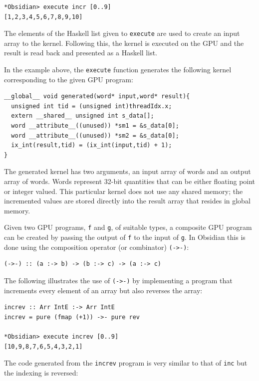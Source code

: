 \begin{small}
\begin{verbatim}
*Obsidian> execute incr [0..9]
[1,2,3,4,5,6,7,8,9,10]
\end{verbatim}
\end{small}
\noindent
The elements of the Haskell list given to {\tt execute} are used to create 
an input array to the kernel. Following this, the kernel is executed on the
GPU and the result is read back and presented as a Haskell list. 

In the example above, the {\tt execute} function generates the following kernel 
corresponding to the given GPU program:
\begin{small}
\begin{verbatim}
__global__ void generated(word* input,word* result){
  unsigned int tid = (unsigned int)threadIdx.x;
  extern __shared__ unsigned int s_data[];
  word __attribute__((unused)) *sm1 = &s_data[0];
  word __attribute__((unused)) *sm2 = &s_data[0];
  ix_int(result,tid) = (ix_int(input,tid) + 1);
}
\end{verbatim}
\end{small}
\noindent
The generated kernel has two arguments, an input array of words and an 
output array of words. Words represent 32-bit quantities that can be either
floating point or integer valued. This particular kernel does not use 
any shared memory; the incremented values are stored directly into the 
result array that resides in global memory.  

\pagebreak 

Given two GPU programs, {\tt f} and {\tt g}, of suitable types, a 
composite GPU program can be created by passing the output of {\tt f} to the 
input of {\tt g}. In Obsidian this is done using the composition operator (or combinator)
{\tt (->-)}: 


\begin{small}
\begin{verbatim}
(->-) :: (a :-> b) -> (b :-> c) -> (a :-> c)
\end{verbatim}
\end{small}
\noindent
The following illustrates the use of {\tt (->-)} by implementing a 
program that increments every element of an array but also reverses 
the array: 

\begin{small}
\begin{verbatim}
increv :: Arr IntE :-> Arr IntE 
increv = pure (fmap (+1)) ->- pure rev

*Obsidian> execute increv [0..9]
[10,9,8,7,6,5,4,3,2,1]
\end{verbatim}
\end{small}
\noindent
The code generated from the {\tt increv} program is very similar to that 
of {\tt inc} but the indexing is reversed:

